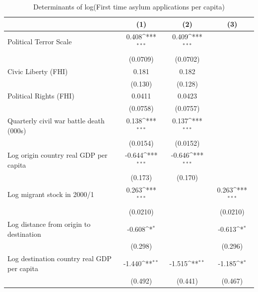 \documentclass[a4paper,12pt]{article}
\newcommand{\sym}[1]{\rlap{#1}}
\begin{document}
 \begin{table}[htbp]\centering
\def\sym#1{\ifmmode^{#1}\else\(^{#1}\)\fi}
\caption{Determinants of log(First time asylum applications per capita)}
\begin{tabular}{l*{3}{c}}
\hline\hline
                    &\multicolumn{1}{c}{(1)}         &\multicolumn{1}{c}{(2)}         &\multicolumn{1}{c}{(3)}         \\
\hline
Political Terror Scale&       0.408\sym{***}&       0.409\sym{***}&                     \\
                    &    (0.0709)         &    (0.0702)         &                     \\
[0.5em]
Civic Liberty (FHI) &       0.181         &       0.182         &                     \\
                    &     (0.130)         &     (0.128)         &                     \\
[0.5em]
Political Rights (FHI)&      0.0411         &      0.0423         &                     \\
                    &    (0.0758)         &    (0.0757)         &                     \\
[0.5em]
Quarterly civil war battle death (000s)&       0.138\sym{***}&       0.137\sym{***}&                     \\
                    &    (0.0154)         &    (0.0152)         &                     \\
[0.5em]
Log origin country real GDP per capita&      -0.644\sym{***}&      -0.646\sym{***}&                     \\
                    &     (0.173)         &     (0.170)         &                     \\
[0.5em]
Log migrant stock in 2000/1&       0.263\sym{***}&                     &       0.263\sym{***}\\
                    &    (0.0210)         &                     &    (0.0210)         \\
[0.5em]
Log distance from origin to destination&      -0.608\sym{*}  &                     &      -0.613\sym{*}  \\
                    &     (0.298)         &                     &     (0.296)         \\
[0.5em]
Log destination country real GDP per capita&      -1.440\sym{**} &      -1.515\sym{**} &      -1.185\sym{*}  \\
                    &     (0.492)         &     (0.441)         &     (0.467)         \\

\end{tabular}
\end{table}
\end{document}
